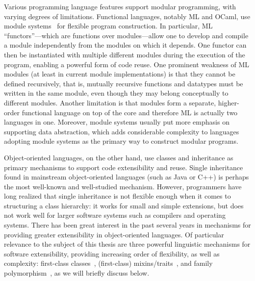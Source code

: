 Various programming language features support modular programming, with varying
degrees of limitations. Functional languages, notably ML and OCaml, use module
systems~\citep{MacQueen_1984} for flexible program construction. In particular,
ML ``functors''---which are functions over modules---allow
one to develop and compile a module independently from the modules on which it
depends. One functor can then be instantiated with multiple different modules
during the execution of the program, enabling a powerful form of code reuse. One
prominent weakness of ML modules (at least in current module implementations) is
that they cannot be defined recursively, that is, mutually recursive functions
and datatypes must be written in the same module, even though they may belong
conceptually to different modules. Another limitation is that modules form a
separate, higher-order functional language on top of the core and therefore ML
is actually two languages in one. Moreover, module systems usually put more
emphasis on supporting data abstraction, which adds considerable complexity to
languages adopting module systems as the primary way to construct modular
programs.

Object-oriented languages, on the other hand, use classes and inheritance as primary
mechanisms to support code extensibility and reuse. Single inheritance found in
mainstream object-oriented languages (such as Java or C++) is perhaps the most
well-known and well-studied mechanism. However, programmers have long realized
that single inheritance is not flexible enough when it comes to structuring a
class hierarchy: it works for small and simple extensions, but does not work
well for larger software systems such as compilers and operating systems. There
has been great interest in the past several years in mechanisms for providing
greater extensibility in object-oriented languages. Of particular relevance to
the subject of this thesis are three powerful linguistic mechanisms for software
extensibility, providing increasing order of flexibility, as well as complexity:
first-class classes~\citep{DBLP:conf/oopsla/TakikawaSDTF12}, (first-class)
mixins/traits~\citep{bracha1990mixin, scharli2003traits}, and family
polymorphism~\citep{Ernst_2001}, as we will briefly discuss below.


